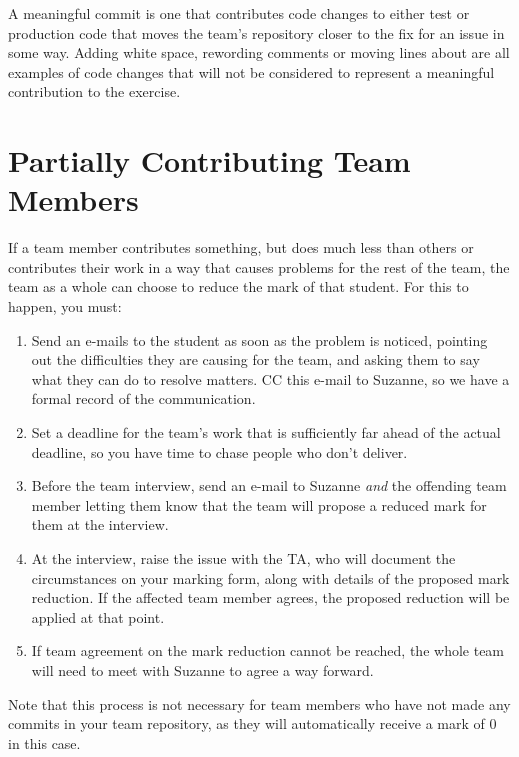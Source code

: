 \documentclass[
]{book}
\providecommand{\tightlist}{%
  \setlength{\itemsep}{0pt}\setlength{\parskip}{0pt}}
\begin{document}
A meaningful commit is one that contributes code changes to either test or production code that moves the team's repository closer to the fix for an issue in some way. Adding white space, rewording comments or moving lines about are all examples of code changes that will not be considered to represent a meaningful contribution to the exercise.

\hypertarget{partially-contributing-team-members}{%
\section{Partially Contributing Team Members}\label{partially-contributing-team-members}}

If a team member contributes something, but does much less than others or contributes their work in a way that causes problems for the rest of the team, the team as a whole can choose to reduce the mark of that student. For this to happen, you must:

\begin{enumerate}
\def\labelenumi{\arabic{enumi}.}
\tightlist
\item
  Send an e-mails to the student as soon as the problem is noticed, pointing out the difficulties they are causing for the team, and asking them to say what they can do to resolve matters. CC this e-mail to Suzanne, so we have a formal record of the communication.
\item
  Set a deadline for the team's work that is sufficiently far ahead of the actual deadline, so you have time to chase people who don't deliver.
\item
  Before the team interview, send an e-mail to Suzanne \emph{and} the offending team member letting them know that the team will propose a reduced mark for them at the interview.
\item
  At the interview, raise the issue with the TA, who will document the circumstances on your marking form, along with details of the proposed mark reduction. If the affected team member agrees, the proposed reduction will be applied at that point.
\item
  If team agreement on the mark reduction cannot be reached, the whole team will need to meet with Suzanne to agree a way forward.
\end{enumerate}

Note that this process is not necessary for team members who have not made any commits in your team repository, as they will automatically receive a mark of 0 in this case.
\end{document}
